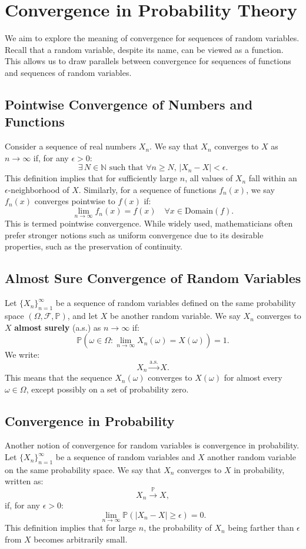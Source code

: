 \section{Convergence in Probability Theory}  
We aim to explore the meaning of convergence for sequences of random variables. Recall that a random variable, despite its name, can be viewed as a function. This allows us to draw parallels between convergence for sequences of functions and sequences of random variables.  

\subsection{Pointwise Convergence of Numbers and Functions}  
Consider a sequence of real numbers \(X_n\). We say that \(X_n\) converges to \(X\) as \(n \to \infty\) if, for any \(\epsilon > 0\):  
\[
\exists \, N \in \mathbb{N} \text{ such that } \forall n \geq N, \, |X_n - X| < \epsilon.
\]
This definition implies that for sufficiently large \(n\), all values of \(X_n\) fall within an \(\epsilon\)-neighborhood of \(X\). \newline
Similarly, for a sequence of functions \(f_n(x)\), we say \(f_n(x)\) converges pointwise to \(f(x)\) if:
\[
\lim_{n \to \infty} f_n(x) = f(x) \quad \forall x \in \text{Domain}(f).
\]
This is termed pointwise convergence. While widely used, mathematicians often prefer stronger notions such as uniform convergence due to its desirable properties, such as the preservation of continuity.  

\subsection{Almost Sure Convergence of Random Variables}  
Let \(\{X_n\}_{n=1}^\infty\) be a sequence of random variables defined on the same probability space \((\Omega, \mathcal{F}, \mathbb{P})\), and let \(X\) be another random variable. We say \(X_n\) converges to \(X\) \textbf{almost surely} (a.s.) as \(n \to \infty\) if:  
\[
\mathbb{P} \left( \omega \in \Omega : \lim_{n \to \infty} X_n(\omega) = X(\omega) \right) = 1.
\]
We write:
\[
X_n \xrightarrow{\text{a.s.}} X.
\]
This means that the sequence \(X_n(\omega)\) converges to \(X(\omega)\) for almost every \(\omega \in \Omega\), except possibly on a set of probability zero.  

\subsection{Convergence in Probability}  
Another notion of convergence for random variables is convergence in probability. Let \(\{X_n\}_{n=1}^\infty\) be a sequence of random variables and \(X\) another random variable on the same probability space. We say that \(X_n\) converges to \(X\) in probability, written as:
\[
X_n \xrightarrow{\mathbb{P}} X,
\]
if, for any \(\epsilon > 0\):
\[
\lim_{n \to \infty} \mathbb{P}(|X_n - X| \geq \epsilon) = 0.
\]
This definition implies that for large \(n\), the probability of \(X_n\) being farther than \(\epsilon\) from \(X\) becomes arbitrarily small.  


